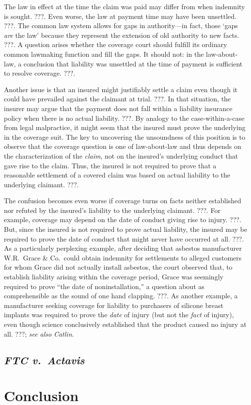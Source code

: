 \documentclass[
  12pt,
  letterpaper,
]{scrartcl}
\begin{document}
The law in effect at the time the claim was paid may differ from when indemnity
is sought. ???. Even worse, the law at payment time may have been unsettled.
???. The common law system allows for gaps in authority---in fact, those `gaps
\emph{are} the law' because they represent the extension of old authority to
new facts. ???. A question arises whether the coverage court should fulfill its
ordinary common lawmaking function and fill the gaps. It should not: in the
law-about-law, a conclusion that liability was unsettled at the time of payment
is sufficient to resolve coverage. ???.

Another issue is that an insured might justifiably settle a claim even though
it could have prevailed against the claimant at trial. ???. In that situation,
the insurer may argue that the payment does not fall within a liability
insurance policy when there is no actual liability. ???. By analogy to the
case-within-a-case from legal malpractice, it might seem that the insured must
prove the underlying in the coverage suit. The key to uncovering the
unsoundness of this position is to observe that the coverage question is one of
law-about-law and thus depends on the characterization of the \emph{claim}, not
on the insured's underlying conduct that gave rise to the claim. Thus, the
insured is not required to prove that a reasonable settlement of a covered
claim was based on actual liability to the underlying claimant. ???.

The confusion becomes even worse if coverage turns on facts neither established
nor refuted by the insured's liability to the underlying claimant. ???. For
example, coverage may depend on the date of conduct giving rise to injury. ???.
But, since the insured is not required to prove actual liability, the insured
may be required to prove the date of conduct that might never have occurred at
all. ???. As a particularly perplexing example, after deciding that asbestos
manufacturer W.R.~Grace \& Co.~could obtain indemnity for settlements to
alleged customers for whom Grace did not actually install asbestos, the court
observed that, to establish liability arising within the coverage period, Grace
was seemingly required to prove ``the date of noninstallation,'' a question
about as comprehensible as the sound of one hand clapping. ???. As another
example, a manufacturer seeking coverage for liability to purchasers of
silicone breast implants was required to prove the \emph{date} of injury (but
not the \emph{fact} of injury), even though science conclusively established
that the product caused no injury at all. ???; \textit{see also}
\textit{Catlin}.

\subsection{\textit{FTC v.~Actavis}}


\section{Conclusion}
\end{document}
